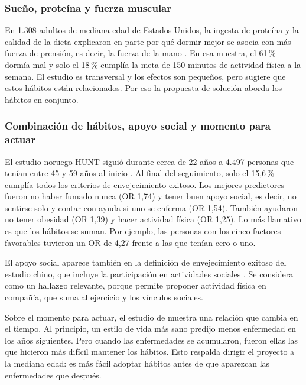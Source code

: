 \documentclass[12pt, letterpaper, table, xcdraw]{extarticle}
\begin{document}
\subsubsection{Sueño, proteína y fuerza muscular}

En 1.308 adultos de mediana edad de Estados Unidos, la ingesta de proteína y la calidad de la dieta explicaron en parte por qué dormir mejor se asocia con más fuerza de prensión, es decir, la fuerza de la mano \parencite{kuczmarski2025}. En esa muestra, el 61\,\% dormía mal y solo el 18\,\% cumplía la meta de 150 minutos de actividad física a la semana. El estudio es transversal y los efectos son pequeños, pero sugiere que estos hábitos están relacionados. Por eso la propuesta de solución aborda los hábitos en conjunto.

\subsubsection{Combinación de hábitos, apoyo social y momento para actuar}

El estudio noruego HUNT siguió durante cerca de 22 años a 4.497 personas que tenían entre 45 y 59 años al inicio \parencite{bosnes2019}. Al final del seguimiento, solo el 15,6\,\% cumplía todos los criterios de envejecimiento exitoso. Los mejores predictores fueron no haber fumado nunca (OR 1,74) y tener buen apoyo social, es decir, no sentirse solo y contar con ayuda si uno se enferma (OR 1,54). También ayudaron no tener obesidad (OR 1,39) y hacer actividad física (OR 1,25). Lo más llamativo es que los hábitos se suman. Por ejemplo, las personas con los cinco factores favorables tuvieron un OR de 4,27 frente a las que tenían cero o uno.

El apoyo social aparece también en la definición de envejecimiento exitoso del estudio chino, que incluye la participación en actividades sociales \parencite{zhang2025}. Se considera como un hallazgo relevante, porque permite proponer actividad física en compañía, que suma al ejercicio y los vínculos sociales.

Sobre el momento para actuar, el estudio de \textcite{zhu2025} muestra una relación que cambia en el tiempo. Al principio, un estilo de vida más sano predijo menos enfermedad en los años siguientes. Pero cuando las enfermedades se acumularon, fueron ellas las que hicieron más difícil mantener los hábitos. Esto respalda dirigir el proyecto a la mediana edad: es más fácil adoptar hábitos antes de que aparezcan las enfermedades que después.
\end{document}
